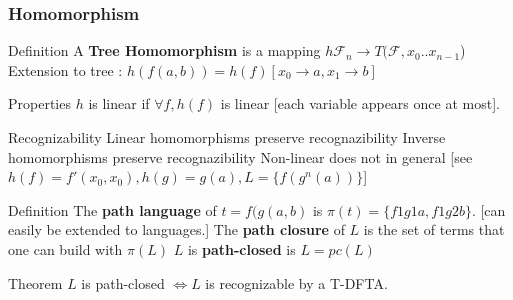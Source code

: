 \documentclass[pdf]{beamer}
\newcommand{\F}{\mathcal{F}}
\begin{document}
\begin{frame}
\frametitle{Homomorphism}

\begin{block}{Definition}
A \textbf{Tree Homomorphism} is a mapping $h \F_n \rightarrow T(\F,x_0..x_{n-1}$)\newline
Extension to tree : $h(f(a,b)) = h(f)[x_0 \rightarrow a, x_1 \rightarrow b]$\newline
\end{block}

\begin{exampleblock}{Properties}
$h$ is linear if $\forall f, h(f)$  is linear [each variable appears once at most].
\end{exampleblock}

\begin{alertblock}{Recognizability}
Linear homomorphisms preserve recognazibility \newline
Inverse homomorphisms preserve recognazibility \newline
Non-linear does not in general 
[see $h(f)=f'(x_0,x_0), h(g)=g(a), L=\{f(g^n(a))\}$]
\end{alertblock}

\end{frame}

\begin{frame}
\begin{block}{Definition}
The \textbf{path language} of $t=f(g(a,b)$ is $\pi(t)=\{f1g1a,f1g2b\}$. [can easily be extended to languages.]
The \textbf{path closure} of $L$ is the set of terms that one can build with $\pi(L)$
$L$ is \textbf{path-closed} is $L=pc(L)$
\end{block}


\begin{alertblock}{Theorem}
$L$ is path-closed $\Leftrightarrow L$ is recognizable by a T-DFTA.
\end{alertblock}

\end{frame}
\end{document}
